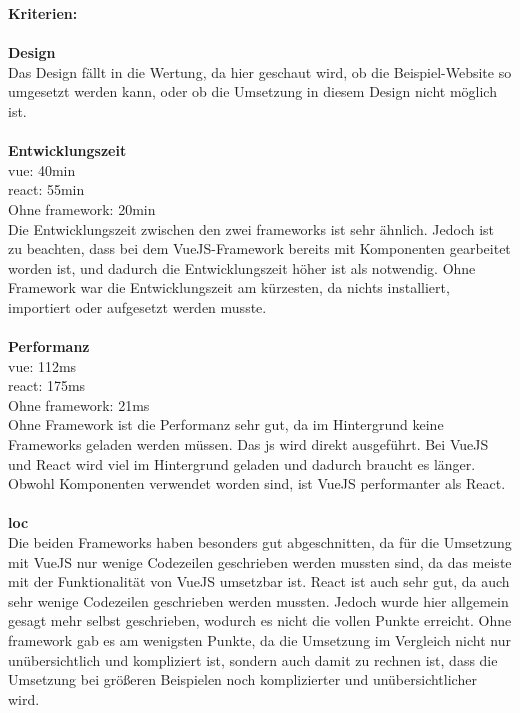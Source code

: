 \textbf{Kriterien:}\\\\
\textbf{Design}\\
Das Design fällt in die Wertung, da hier geschaut wird, ob die Beispiel-Website so umgesetzt werden kann, oder ob die Umsetzung in diesem Design nicht möglich ist.\\\\
\textbf{Entwicklungszeit}\\
\Gls{vue}: 40min\\
\Gls{react}: 55min\\
Ohne \Gls{framework}: 20min\\
Die Entwicklungszeit zwischen den zwei \Gls{framework}s ist sehr ähnlich. Jedoch ist zu beachten, dass bei dem VueJS-Framework bereits mit Komponenten gearbeitet worden ist, und dadurch die Entwicklungszeit höher ist als notwendig. Ohne Framework war die Entwicklungszeit am kürzesten, da nichts installiert, importiert oder aufgesetzt werden musste.\\\\
\textbf{Performanz}\\
\Gls{vue}: 112ms\\
\Gls{react}: 175ms\\
Ohne \Gls{framework}: 21ms\\
Ohne Framework ist die Performanz sehr gut, da im Hintergrund keine Frameworks geladen werden müssen. Das \Gls{js} wird direkt ausgeführt. Bei VueJS und React wird viel im Hintergrund geladen und dadurch braucht es länger. Obwohl Komponenten verwendet worden sind, ist VueJS performanter als React.\\\\
\textbf{\Gls{loc}}\\
Die beiden Frameworks haben besonders gut abgeschnitten, da für die Umsetzung mit VueJS nur wenige Codezeilen geschrieben werden mussten sind, da das meiste mit der Funktionalität von VueJS umsetzbar ist. React ist auch sehr gut, da auch sehr wenige Codezeilen geschrieben werden mussten. Jedoch wurde hier allgemein gesagt mehr selbst geschrieben, wodurch es nicht die vollen Punkte erreicht.
Ohne \Gls{framework} gab es am wenigsten Punkte, da die Umsetzung im Vergleich nicht nur unübersichtlich und kompliziert ist, sondern auch damit zu rechnen ist, dass die Umsetzung bei größeren Beispielen noch komplizierter und unübersichtlicher wird.
